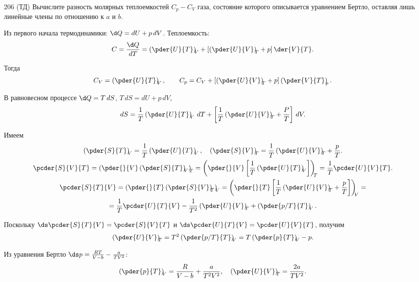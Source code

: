 \documentclass[pscyr]{hedwork}
\newcommand{\tpder}[3]{\left(\pder{#1}{#2}\right)_{\!\!#3}}
\begin{document}
  \begin{task}{206 (ТД)}{
    Вычислите разность молярных теплоемкостей \( C_p - C_V \) газа, состояние
    которого описывается уравнением Бертло, оставляя лишь линейные члены по
    отношению к \( a \) и \( b \).
  }
  
    Из первого начала термодинамики: \( \d Q = dU + p\,dV \). Теплоемкость:
    \[
      C = \frac{\d Q}{dT} = \tpder{U}{T}{V} + \left[\tpder{U}{V}{T} + p\right]
        \der{V}{T}.
    \]
    
    Тогда
    \[
      C_V = \tpder{U}{T}{V}, \qquad
        C_p = C_V + \left[\tpder{U}{V}{T} + p\right]\tpder{V}{T}{p}.
    \]
    
    В равновесном процессе \( \d Q = T\,dS \), \( T\,dS = dU + p\,dV \),
    \[
      dS = \frac{1}{T}\tpder{U}{T}{V}\,dT + \left[\frac{1}{T}\tpder{U}{V}{T} +
        \frac{P}{T}\right]\,dV.
    \]
    
    Имеем
    \begin{gather*}
      \tpder{S}{T}{V} = \frac{1}{T}\tpder{U}{T}{V}, \quad
        \tpder{S}{V}{T} = \frac{1}{T}\tpder{U}{V}{T} + \frac{p}{T}. \\
      \pcder{S}{V}{T} = \left(\pder{}{V}\tpder{S}{T}{V}\right)_{\!\!T} =
        \left(\pder{}{V}\left[\frac{1}{T}\tpder{U}{T}{V}\right]\right)_{\!\!T}
        = \frac{1}{T} \pcder{U}{V}{T}. \\
      \pcder{S}{T}{V} = \left(\pder{}{T}\tpder{S}{V}{T}\right)_{\!\!V} =
        \left(\pder{}{T}\left[\frac{1}{T}\tpder{U}{V}{T} + \frac{p}{T}\right]
        \right)_{\!\!V} = \\
      = \frac{1}{T}\pcder{U}{T}{V} - \frac{1}{T^2}\tpder{U}{V}{T} +
        \tpder{p/T}{T}{V}.
    \end{gather*}
    
    Поскольку \( \ds \pcder{S}{T}{V} = \pcder{S}{V}{T} \) и
    \( \ds \pcder{U}{T}{V} = \pcder{U}{V}{T} \), получим
    \[
      \tpder{U}{V}{T} = T^2\tpder{p/T}{T}{V} = T\tpder{p}{T}{V} - p.
    \]
    
    Из уравнения Бертло \( \ds p = \frac{RT}{V - b} - \frac{a}{TV^2} \):
    \[
      \tpder{p}{T}{V} = \frac{R}{V - b} + \frac{a}{T^2V^2}, \quad
        \tpder{U}{V}{T} = \frac{2a}{TV^2}.
    \]
    

\end{task}
\end{document}
